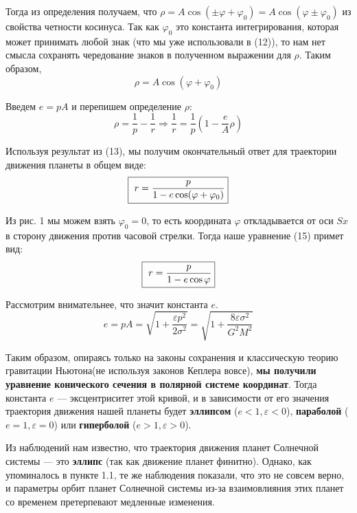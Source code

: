 \documentclass[12pt]{article}
\newcommand{\te}{\ensuremath{\Rightarrow}}
\begin{document}
 Тогда из определения получаем, что $ \rho = A\cos(\pm\varphi + \varphi_0) = A\cos(\varphi \pm \varphi_0) $ из свойства четности косинуса. Так как $ \varphi_0 $ это константа интегрирования, которая может принимать любой знак (что мы уже использовали в (12)), то нам нет смысла сохранять чередование знаков в полученном выражении для $ \rho $. Таким образом, 
 \begin{equation}
 \rho  = A\cos(\varphi + \varphi_0) 
 \end{equation}
 
 Введем $ e = pA $ и перепишем определение $ \rho $: 
 \begin{equation}
 \rho = \dfrac 1p - \dfrac 1r \te \dfrac 1r = \dfrac 1p \left( 1 - \dfrac eA \rho\right) 
 \end{equation}
 
 Используя результат из (13), мы получим окончательный ответ для траектории движения планеты в общем виде: 
 \begin{equation}
 \fbox{ $ r = \dfrac{p}{ 1 - e\cos(\varphi + \varphi_0)  }
	   	 $}
 \end{equation}
 
 Из рис. 1 мы можем взять $ \varphi_0 = 0 $, то есть координата $ \varphi $ откладывается от оси $ Sx $ в сторону движения против часовой стрелки. Тогда наше уравнение (15) примет вид: 
 \begin{equation}
 \fbox{ $ r = \dfrac{p}{ 1 - e\cos\varphi   }
 	$}
 \end{equation}
 
 Рассмотрим внимательнее, что значит константа $ e $. 
 \begin{equation}
 e = pA = \sqrt{1 + \dfrac{\varepsilon p^2}{2\sigma^2}} = \sqrt{1+ \dfrac{8\varepsilon\sigma^2}{G^2M^2}}
 \end{equation}
 
 Таким образом, опираясь только на законы сохранения и классическую теорию гравитации Ньютона(не используя законов Кеплера вовсе), \textbf{мы получили уравнение конического сечения в полярной системе координат}. Тогда константа $ e $ --- эксцентриситет этой кривой, и в зависимости от его значения траектория движения нашей планеты будет \textbf{эллипсом} ($ e < 1, \varepsilon < 0 $), \textbf{параболой} ($ e = 1, \varepsilon = 0 $) или \textbf{гиперболой} ($ e >1, \varepsilon >0 $).
 
 Из наблюдений нам известно, что траектория движения планет Солнечной системы --- это \textbf{эллипс} (так как движение планет финитно). Однако, как упоминалось в пункте 1.1, те же наблюдения показали, что это не совсем верно, и параметры орбит планет Солнечной системы из-за взаимовлияния этих планет со временем претерпевают медленные изменения. 
 
\end{document}
